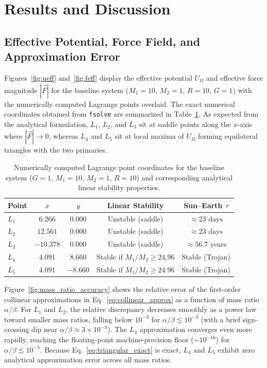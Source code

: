 \documentclass[12pt, letterpaper]{article}
\begin{document}
\section{Results and Discussion}

\subsection{Effective Potential, Force Field, and Approximation Error}

Figures~\ref{fig:ueff} and~\ref{fig:feff} display the effective potential $U_\Omega$ and effective force magnitude $|\vec{F}|$ for the baseline system ($M_1 = 10$, $M_2 = 1$, $R = 10$, $G = 1$) with the numerically computed Lagrange points overlaid. The exact numerical coordinates obtained from \texttt{fsolve} are summarized in Table~\ref{tab:lagrange_summary}. As expected from the analytical formulation, $L_1$, $L_2$, and $L_3$ sit at saddle points along the $x$-axis where $|\vec{F}| \to 0$, whereas $L_4$ and $L_5$ sit at local maxima of $U_\Omega$ forming equilateral triangles with the two primaries.

\begin{table}[htbp]
\centering
\singlespacing
\caption{Numerically computed Lagrange point coordinates for the baseline system ($G = 1$, $M_1 = 10$, $M_2 = 1$, $R = 10$) and corresponding analytical linear stability properties.}
\label{tab:lagrange_summary}
\begin{tabular}{lcccc}
\toprule
Point & $x$ & $y$ & Linear Stability & Sun--Earth $\tau$ \\
\midrule
$L_1$ & $6.266$   & $0.000$  & Unstable (saddle) & $\approx 23\text{ days}$ \\
$L_2$ & $12.561$  & $0.000$  & Unstable (saddle) & $\approx 23\text{ days}$ \\
$L_3$ & $-10.378$ & $0.000$  & Unstable (saddle) & $\approx 56.7\text{ years}$ \\
$L_4$ & $4.091$   & $8.660$  & Stable if $M_1/M_2 \ge 24.96$ & Stable (Trojan) \\
$L_5$ & $4.091$   & $-8.660$ & Stable if $M_1/M_2 \ge 24.96$ & Stable (Trojan) \\
\bottomrule
\end{tabular}
\end{table}

Figure~\ref{fig:mass_ratio_accuracy} shows the relative error of the first-order collinear approximations in Eq.~\eqref{eq:collinear_approx} as a function of mass ratio $\alpha/\beta$. For $L_1$ and $L_2$, the relative discrepancy decreases smoothly as a power law toward smaller mass ratios, falling below $10^{-3}$ for $\alpha/\beta \lesssim 10^{-3}$ (with a brief sign-crossing dip near $\alpha/\beta \approx 3 \times 10^{-3}$). The $L_3$ approximation converges even more rapidly, reaching the floating-point machine-precision floor ($\sim 10^{-16}$) for $\alpha/\beta \lesssim 10^{-5}$. Because Eq.~\eqref{eq:triangular_exact} is exact, $L_4$ and $L_5$ exhibit zero analytical approximation error across all mass ratios.
\end{document}
